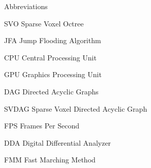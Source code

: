 \begin{dictionary}{Abbreviations}
    \item[SVO] Sparse Voxel Octree
    \item[JFA] Jump Flooding Algorithm
    \item[CPU] Central Processing Unit
    \item[GPU] Graphics Processing Unit
    \item[DAG] Directed Acyclic Graphs
    \item[SVDAG] Sparse Voxel Directed Acyclic Graph
    \item[FPS] Frames Per Second
    \item[DDA] Digital Differential Analyzer
    \item[FMM] Fast Marching Method
\end{dictionary}

